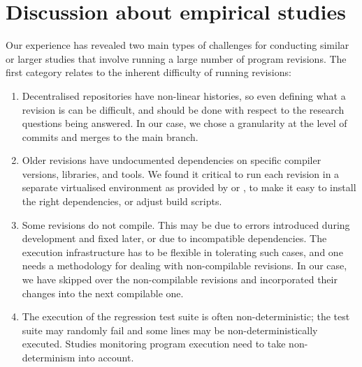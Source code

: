 \section{Discussion about empirical studies}
\label{evolution:discussion}


Our experience has revealed two main types of challenges for conducting similar
or larger studies that involve running a large number of program revisions. The
first category relates to the inherent difficulty of running revisions:

\begin{enumerate}
\item Decentralised repositories have non-linear histories, so even
  defining what a revision is can be difficult, and should be done
  with respect to the research questions being answered.  In our case,
  we chose a granularity at the level of commits and merges to the
  main branch.

\item Older revisions have undocumented dependencies on specific
  compiler versions, libraries, and tools.  We found it critical to run each
  revision in a separate virtualised environment as provided by \lxc or
  \docker, to make it easy to install the right dependencies, or adjust build
  scripts.

\item Some revisions do not compile.  This may be due to errors
  introduced during development and fixed later, or due to incompatible
  dependencies. The execution infrastructure has to be
  flexible in tolerating such cases, and one needs a methodology for
  dealing with non-compilable revisions.  In our case, we have skipped
  over the non-compilable revisions and incorporated their changes into
  the next compilable one.

\item The execution of the regression test suite is often non-deterministic;
  the test suite may randomly fail and some lines may be non-deterministically
  executed. Studies monitoring program execution need to take non-determinism
  into account.
\end{enumerate}

